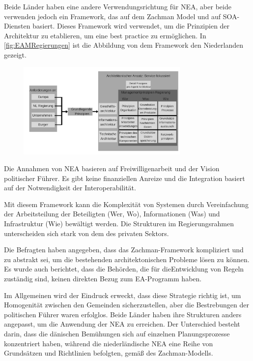 \documentclass[
	doc,
	a4paper,
	helv
	]{apa6}
\begin{document}
Beide Länder haben eine andere Verwendungsrichtung für NEA, aber beide verwenden jedoch ein Framework, das auf dem Zachman Model und auf SOA-Diensten basiert. Dieses Framework wird verwendet, um die Prinzipien der Architektur zu etablieren, um eine best practice zu ermöglichen. In \autoref{fig:EAMRegierungen} ist die Abbildung von dem Framework den Niederlanden gezeigt.

\begin{figure}[!htbp]
\begin{center}
\includegraphics[width=0.75\textwidth]{Abbildungen/EAMRegierungen.png}
\caption{}
\label{fig:EAMRegierungen}
\end{center}
\end{figure}

\newpage
Die Annahmen von NEA basieren auf Freiwilligenarbeit und der Vision politischer Führer. Es gibt keine finanziellen Anreize und die Integration basiert auf der Notwendigkeit der Interoperabilität.

Mit diesem Framework kann die Komplexität von Systemen durch Vereinfachung der Arbeitsteilung der Beteiligten (Wer, Wo), Informationen (Was) und Infrastruktur (Wie) bewältigt werden. Die Strukturen im Regierungsrahmen unterscheiden sich stark von dem des privaten Sektors.

Die Befragten haben angegeben, dass das Zachman-Framework kompliziert und zu abstrakt sei, um die bestehenden architektonischen Probleme lösen zu können. Es wurde auch berichtet, dass die Behörden, die für dieEntwicklung von Regeln zuständig sind, keinen direkten Bezug zum EA-Programm haben.

Im Allgemeinen wird der Eindruck erweckt, dass diese Strategie richtig ist, um Homogenität zwischen den Gemeinden  sicherzustellen, aber die Bestrebungen der politischen Führer waren erfolglos.
Beide Länder haben ihre Strukturen anders angepasst, um die Anwendung der NEA zu erreichen. Der Unterschied besteht darin, dass die dänischen Bemühungen  sich auf einzelnen Planungsprozesse konzentriert haben, während die niederländische NEA eine Reihe von Grundsätzen und Richtlinien befolgten, gemäß des Zachman-Modells.
\end{document}
